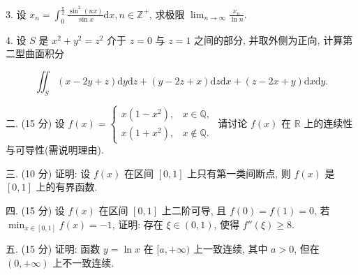 \documentclass{examcollection}
\renewcommand{\displayformula}[1]{\[#1\]}
\begin{document}
{\begin{minipage}{\textwidth}
3. 设 $x_{n} = \int_{0}^{\frac{\pi}{2}}\frac{\sin^{2}(nx)}{\sin x}\mathrm{d}x, n\in \mathbb{Z}^{+}$, 求极限 $\lim_{n\to \infty}\frac{x_n}{\ln n}$.\par
4. 设 $S$ 是 $x^{2} + y^{2} = z^{2}$ 介于 $z = 0$ 与 $z = 1$ 之间的部分, 并取外侧为正向, 计算第二型曲面积分\par
\displayformula{\iint_ {S} (x - 2 y + z) \mathrm{d} y \mathrm{d} z + (y - 2 z + x) \mathrm{d} z \mathrm{d} x + (z - 2 x + y) \mathrm{d} x \mathrm{d} y.}\par
二. (15 分) 设 $f(x) = \begin{cases} x(1 - x^2), & x \in \mathbb{Q}, \\ x(1 + x^2), & x \notin \mathbb{Q}. \end{cases}$ 请讨论 $f(x)$ 在 $\mathbb{R}$ 上的连续性与可导性(需说明理由).\par
三. (10 分) 证明: 设 $f(x)$ 在区间 $[0,1]$ 上只有第一类间断点, 则 $f(x)$ 是 $[0,1]$ 上的有界函数.\par
四. (15 分) 设 $f(x)$ 在区间 $[0,1]$ 上二阶可导, 且 $f(0) = f(1) = 0$, 若 $\min_{x \in [0,1]} f(x) = -1$, 证明: 存在 $\xi \in (0,1)$, 使得 $f''(\xi) \geq 8$.\par
五. (15 分) 证明: 函数 $y = \ln x$ 在 $[a, +\infty)$ 上一致连续, 其中 $a > 0$, 但在 $(0, +\infty)$ 上不一致连续.\par
\end{minipage}}
\ifdim\dimexpr\ht\proofbox+\dp\proofbox\relax>\textheight
\noindent\resizebox{!}{\textheight}{\usebox{\proofbox}}\else\noindent\usebox{\proofbox}\fi\clearpage
\end{document}
